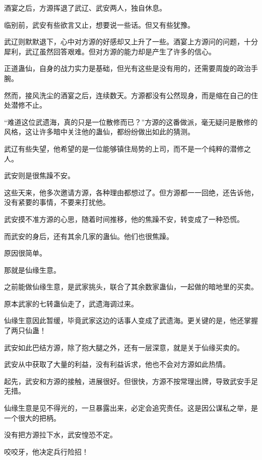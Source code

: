 \begin{this_body}
酒宴之后，方源挥退了武辽、武安两人，独自休息。

临别前，武安有些欲言又止，想要说一些话。但又有些犹豫。

武辽则默默退下，心中对方源的好感却又上升了一些。酒宴上方源问的问题，十分犀利，武辽虽然回答艰难。但对方源的能力却是产生了许多的信心。

正道蛊仙，自身的战力实力是基础，但光有这些是没有用的，还需要周旋的政治手腕。

然而，接风洗尘的酒宴之后，连续数天。方源都没有公然现身，而是缩在自己的住处潜修不止。

“难道这位武遗海，真的只是一位散修而已？”方源的这番做派，毫无疑问是散修的风格，这让许多暗中关注他的蛊仙，都纷纷做出如此的猜测。

武辽有些失望，他希望的是一位能够镇住局势的上司，而不是一个纯粹的潜修之人。

武安则是很焦躁不安。

这些天来，他多次邀请方源，各种理由都想过了。但方源都一一回绝，还告诉他，没有紧要的事情，不要来打扰他。

武安摸不准方源的心思，随着时间推移，他的焦躁不安，转变成了一种恐慌。

而武安的身后，还有其余几家的蛊仙。他们也很焦躁。

原因很简单。

那就是仙缘生意。

之前能做仙缘生意，是武家挑头，联合了其余数家蛊仙，一起做的暗地里的买卖。

原本武家的七转蛊仙走了，武遗海调过来。

仙缘生意因此暂缓，毕竟武家这边的话事人变成了武遗海。更关键的是，他还掌握了两只仙蛊！

武安如此巴结方源，除了抱大腿之外，还有一层深意，就是关于仙缘买卖的。

武安从中获取了大量的利益，没有利益诉求，他也不会对方源如此热情。

起先，武安和方源的接触，进展很好。但很快，方源不按常理出牌，导致武安手足无措。

仙缘生意是见不得光的，一旦暴露出来，必定会追究责任。这是因公谋私之举，是一个很大的把柄。

没有把方源拉下水，武安惶恐不定。

咬咬牙，他决定兵行险招！

\end{this_body}

